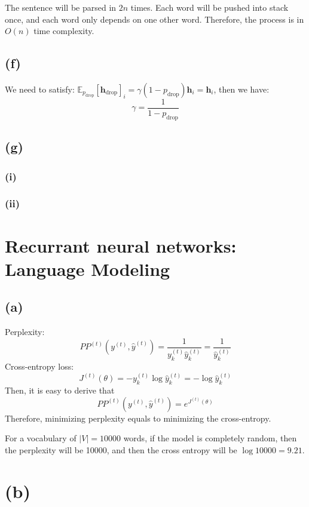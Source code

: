 \documentclass[12pt]{article}
\begin{document}
The sentence will be parsed in $2n$ times. Each word will be pushed into stack once, and each word only depends on one other word. Therefore, the process is in $O(n)$ time complexity.   

\subsection*{(f)}

We need to satisfy: 
$\mathbb{E}_{p_{\mathrm{drop}}}[\bm h_{\mathrm{drop}}]_i = \gamma (1-p_{\mathrm{drop}}) \bm h_i = \bm h_i$, then we have:  
                        $$\gamma = \frac{1}{1 - p_{\mathrm{drop}}}$$


\subsection*{(g)}
\subsubsection*{(i)}

\subsubsection*{(ii)}

\section{Recurrant neural networks: Language Modeling}

\subsection*{(a)}
Perplexity:
$$
PP^{(t)} \left (y^{(t)}, \hat y^{(t)} \right) = \frac{1}{y_k^{(t)} \hat y_k^{(t)}} = \frac{1}{\hat y_k^{(t)}}
$$
Cross-entropy loss:
$$
J^{(t)}(\theta) = -y_k^{(t)} \log \hat y_k^{(t)} = -\log \hat y_k^{(t)}
$$
Then, it is easy to derive that
$$
PP^{(t)} \left (y^{(t)}, \hat y^{(t)} \right) = e^{J^{(t)}(\theta)}
$$
Therefore, minimizing perplexity equals to minimizing the cross-entropy.

For a vocabulary of $|V| = 10000$ words, if the model is completely random, then the perplexity will be 10000, and then the cross entropy will be $\log 10000 = 9.21$.

\section*{(b)}
\end{document}
